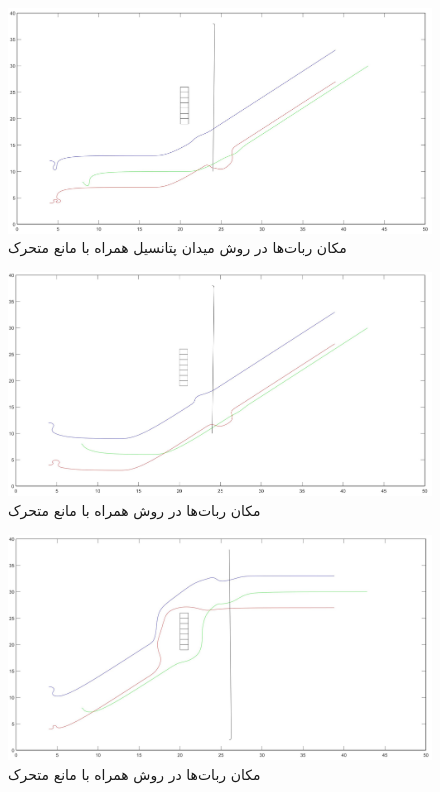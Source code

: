 \begin{figure}[!h]
	\centering
	\includegraphics[scale=0.2]{Images/dynamic-potential-field.jpg}
	\caption{مکان ربات‌ها در روش میدان پتانسیل همراه با مانع متحرک}
\end{figure}

\begin{figure}[!h]
	\centering
	\includegraphics[scale=0.2]{Images/dynamic-BFS.jpg}
	\caption{مکان ربات‌ها در روش  همراه با مانع متحرک}
\end{figure}

\begin{figure}[!h]
	\centering
	\includegraphics[scale=0.2]{Images/dynamic-Greedy.jpg}
	\caption{مکان ربات‌ها در روش  همراه با مانع متحرک}
\end{figure}

